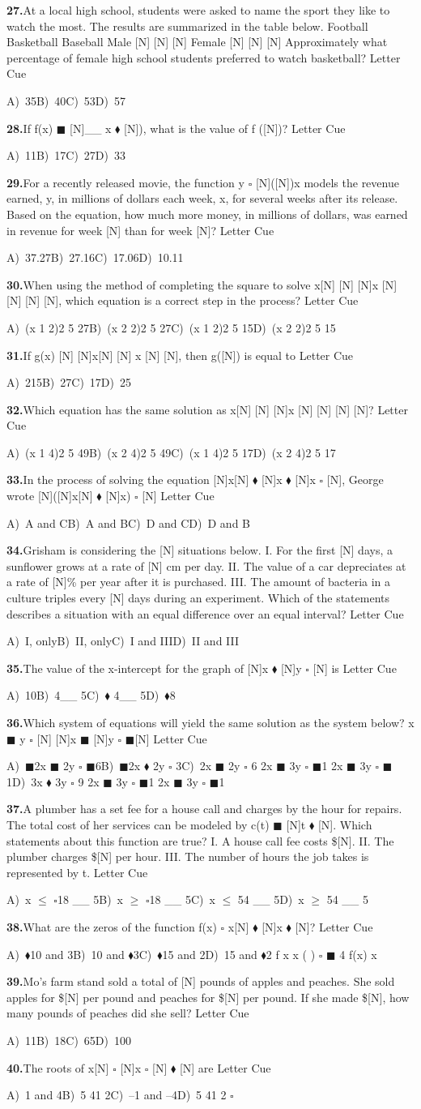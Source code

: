 \documentclass[10pt]{article}
\newcommand{\opA}{\ensuremath{\square}}
\newcommand{\opB}{\ensuremath{\blacksquare}}
\newcommand{\opC}{\ensuremath{\blacklozenge}}
\newcommand{\Q}[6]{%
  \par\vspace{0.38em}%
  \noindent\textbf{#1.}\enspace #2\hfill
  Letter \underline{\hspace{1.05em}}\enspace Cue \underline{\hspace{1.8em}}\par
  \nobreak
  {\small\noindent A)\ #3\quad B)\ #4\quad C)\ #5\quad D)\ #6\par}%
}
\begin{document}
\Q{27}{At a local high school, students were asked to name the sport they like to watch the most. The results are summarized in the table below. Football Basketball Baseball Male [N] [N] [N] Female [N] [N] [N] Approximately what percentage of female high school students preferred to watch basketball?}{35}{40}{53}{57}
\Q{28}{If f(x) \opB{} [N]\_\_ x \opC{} [N]), what is the value of f ([N])?}{11}{17}{27}{33}
\Q{29}{For a recently released movie, the function y \opA{} [N]([N])x models the revenue earned, y, in millions of dollars each week, x, for several weeks after its release. Based on the equation, how much more money, in millions of dollars, was earned in revenue for week [N] than for week [N]?}{37.27}{27.16}{17.06}{10.11}
\Q{30}{When using the method of completing the square to solve x[N] [N] [N]x [N] [N] [N] [N], which equation is a correct step in the process?}{(x 1 2)2 5 27}{(x 2 2)2 5 27}{(x 1 2)2 5 15}{(x 2 2)2 5 15}
\Q{31}{If g(x) [N] [N]x[N] [N] x [N] [N], then g([N]) is equal to}{215}{27}{17}{25}
\Q{32}{Which equation has the same solution as x[N] [N] [N]x [N] [N] [N] [N]?}{(x 1 4)2 5 49}{(x 2 4)2 5 49}{(x 1 4)2 5 17}{(x 2 4)2 5 17}
\Q{33}{In the process of solving the equation [N]x[N] \opC{} [N]x \opC{} [N]x \opA{} [N], George wrote [N]([N]x[N] \opC{} [N]x) \opA{} [N]}{A and C}{A and B}{D and C}{D and B}
\Q{34}{Grisham is considering the [N] situations below. I. For the first [N] days, a sunflower grows at a rate of [N] cm per day. II. The value of a car depreciates at a rate of [N]\% per year after it is purchased. III. The amount of bacteria in a culture triples every [N] days during an experiment. Which of the statements describes a situation with an equal difference over an equal interval?}{I, only}{II, only}{I and III}{II and III}
\Q{35}{The value of the x-intercept for the graph of [N]x \opC{} [N]y \opA{} [N] is}{10}{4\_\_ 5}{\opC{} 4\_\_ 5}{\opC{}8}
\Q{36}{Which system of equations will yield the same solution as the system below? x \opB{} y \opA{} [N] [N]x \opB{} [N]y \opA{} \opB{}[N]}{\opB{}2x \opB{} 2y \opA{} \opB{}6}{\opB{}2x \opC{} 2y \opA{} 3}{2x \opB{} 2y \opA{} 6 2x \opB{} 3y \opA{} \opB{}1 2x \opB{} 3y \opA{} \opB{}1}{3x \opC{} 3y \opA{} 9 2x \opB{} 3y \opA{} \opB{}1 2x \opB{} 3y \opA{} \opB{}1}
\Q{37}{A plumber has a set fee for a house call and charges by the hour for repairs. The total cost of her services can be modeled by c(t) \opB{} [N]t \opC{} [N]. Which statements about this function are true? I. A house call fee costs \$[N]. II. The plumber charges \$[N] per hour. III. The number of hours the job takes is represented by t.}{x \ensuremath{\leq} \opA{}18 \_\_ 5}{x \ensuremath{\geq} \opA{}18 \_\_ 5}{x \ensuremath{\leq} 54 \_\_ 5}{x \ensuremath{\geq} 54 \_\_ 5}
\Q{38}{What are the zeros of the function f(x) \opA{} x[N] \opC{} [N]x \opC{} [N]?}{\opC{}10 and 3}{10 and \opC{}3}{\opC{}15 and 2}{15 and \opC{}2 f x x ( ) \opA{} \opB{} 4 f(x) x}
\Q{39}{Mo's farm stand sold a total of [N] pounds of apples and peaches. She sold apples for \$[N] per pound and peaches for \$[N] per pound. If she made \$[N], how many pounds of peaches did she sell?}{11}{18}{65}{100}
\Q{40}{The roots of x[N] \opA{} [N]x \opA{} [N] \opC{} [N] are}{1 and 4}{5 41 2}{--1 and --4}{5 41 2 \opA{}}
\end{document}
